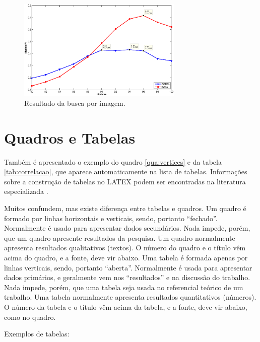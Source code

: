\begin{figure}[!htb]
	\centering
	\includegraphics[width=0.7\textwidth]{./graficos/buscaimg.eps}
	\caption[Resultado da busca por imagem]{Resultado da busca por imagem.}
	\label{chr:buscaimg}
\end{figure}

\section{Quadros e Tabelas}
\label{sec:tabelas}

Também é apresentado o exemplo do quadro \ref{qua:vertices} e da tabela \ref{tab:correlacao}, que aparece automaticamente na lista de tabelas. Informações sobre a construção de tabelas no LATEX podem ser encontradas na literatura especializada \cite{Lamport1986,Buerger1989,Kopka2003,Mittelbach2004}.



Muitos confundem, mas existe diferença entre tabelas e quadros.
Um quadro é formado por linhas horizontais e verticais,
sendo, portanto ``fechado''. Normalmente é usado
para apresentar dados secundários. Nada impede, porém,
que um quadro apresente resultados da pesquisa.
Um quadro normalmente apresenta resultados
qualitativos (textos). O número do quadro e o título
vêm acima do quadro, e a fonte, deve vir abaixo.
Uma tabela é formada apenas por linhas verticais, sendo,
portanto ``aberta''. Normalmente é usada para
apresentar dados primários, e geralmente vem nos
“resultados” e na discussão do trabalho. Nada
impede, porém, que uma tabela seja usada no
referencial teórico de um trabalho. Uma tabela
normalmente apresenta resultados quantitativos
(números). O número da tabela e o título vêm
acima da tabela, e a fonte, deve vir abaixo, como
no quadro.

Exemplos de tabelas:





